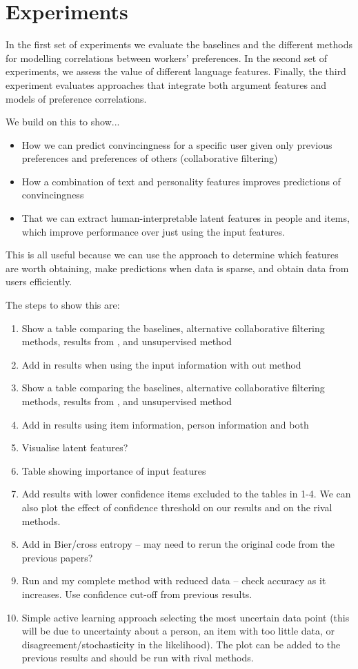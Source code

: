 \section{Experiments}\label{sec:expts}

In the first set of experiments we evaluate the baselines and the different methods for modelling correlations between workers' preferences. In the second set of experiments, we assess the value of different language features. Finally, the third experiment evaluates approaches that integrate both argument features and models of preference correlations.

We build on this to show...
\begin{itemize}
 \item How we can predict convincingness for a specific user given only previous preferences and 
 preferences of others (collaborative filtering)
 \item How a combination of text and personality features improves predictions of convincingness
 \item That we can extract human-interpretable latent features in people and items,
 which improve performance over just using the input features.
\end{itemize}
This is all useful because we can use the approach to determine which features are worth 
obtaining, make predictions when data is sparse, and obtain data from users efficiently.

The steps to show this are:
\begin{enumerate}
  \item Show a table comparing the baselines, alternative collaborative filtering methods, 
  results from \cite{habernal2016argument}, and unsupervised method
  \item Add in results when using the input information with out method
  \item Show a table comparing the baselines, alternative collaborative filtering methods, 
  results from \cite{lukin2017argument}, and unsupervised method
  \item Add in results using item information, person information and both
  \item Visualise latent features?
  \item Table showing importance of input features
  \item Add results with lower confidence items excluded to the tables in 1-4. We can also plot the
  effect of confidence threshold on our results and on the rival methods.
  \item Add in Bier/cross entropy -- may need to rerun the original code from the previous papers?
  \item Run \cite{habernal2016argument} and my complete method with reduced data -- check accuracy as it increases. Use confidence cut-off from previous results.
  \item Simple active learning approach selecting the most uncertain data point (this will be due to 
  uncertainty about a person, an item with too little data, or disagreement/stochasticity in the likelihood). The plot can be added to the previous results and should be run with rival methods.
\end{enumerate}
